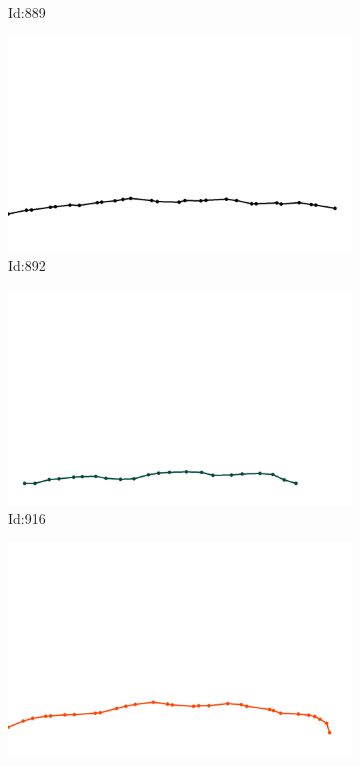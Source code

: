 \documentclass[12pt,twoside]{report}
\begin{document}
\begin{figure}
\begin{subfigure}[b]{0.20\textwidth}
\caption{Id:889}
\end{subfigure}
\begin{subfigure}[b]{0.20\textwidth}
\centering
\includegraphics[width=\textwidth]{../trajectories/892.png}
\caption{Id:892}
\end{subfigure}
\begin{subfigure}[b]{0.20\textwidth}
\centering
\includegraphics[width=\textwidth]{../trajectories/916.png}
\caption{Id:916}
\end{subfigure}
\begin{subfigure}[b]{0.20\textwidth}
\centering
\includegraphics[width=\textwidth]{../trajectories/926.png}

\end{subfigure}
\end{figure}
\end{document}
